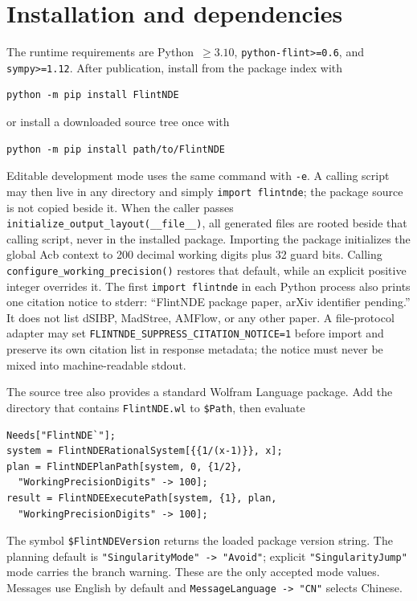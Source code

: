\documentclass[11pt]{article}
\begin{document}
\section{Installation and dependencies}
\label{sec:installation}

The runtime requirements are Python~$\geq3.10$, \texttt{python-flint>=0.6}, and
\texttt{sympy>=1.12}.  After publication, install from the package index with
\begin{verbatim}
python -m pip install FlintNDE
\end{verbatim}
or install a downloaded source tree once with
\begin{verbatim}
python -m pip install path/to/FlintNDE
\end{verbatim}
Editable development mode uses the same command with \texttt{-e}.  A calling script may
then live in any directory and simply \texttt{import flintnde}; the package source is not
copied beside it.  When the caller passes \texttt{initialize\_output\_layout(\_\_file\_\_)},
all generated files are rooted beside that calling script, never in the installed package.
Importing the package initializes the global Acb context to 200 decimal working digits plus
32 guard bits.  Calling \texttt{configure\_working\_precision()} restores that default, while
an explicit positive integer overrides it.
The first \texttt{import flintnde} in each Python process also prints one citation notice to
stderr: ``FlintNDE package paper, arXiv identifier pending.''  It does not list dSIBP,
MadStree, AMFlow, or any other paper.  A file-protocol adapter may set
\texttt{FLINTNDE\_SUPPRESS\_CITATION\_NOTICE=1} before import and preserve its own citation
list in response metadata; the notice must never be mixed into machine-readable stdout.

The source tree also provides a standard Wolfram Language package.  Add the directory that
contains \texttt{FlintNDE.wl} to \texttt{\$Path}, then evaluate
\begin{verbatim}
Needs["FlintNDE`"];
system = FlintNDERationalSystem[{{1/(x-1)}}, x];
plan = FlintNDEPlanPath[system, 0, {1/2},
  "WorkingPrecisionDigits" -> 100];
result = FlintNDEExecutePath[system, {1}, plan,
  "WorkingPrecisionDigits" -> 100];
\end{verbatim}
The symbol \texttt{\$FlintNDEVersion} returns the loaded package version string.  The
planning default is \texttt{"SingularityMode" -> "Avoid"}; explicit
\texttt{"SingularityJump"} mode carries the branch warning.  These are the only accepted
mode values.  Messages use English by default and
\texttt{MessageLanguage -> "CN"} selects Chinese.
\end{document}
